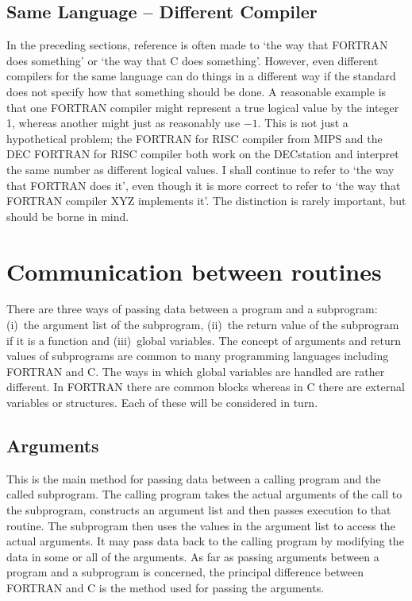 \subsection{Same Language -- Different Compiler}

In the preceding sections, reference is often made to `the way that FORTRAN
does something' or `the way that C does something'. However, even different
compilers for the same language can do things in a different way if the
standard does not specify how that something should be done. A reasonable
example is that one FORTRAN compiler might represent a true logical value by
the integer 1, whereas another might just as reasonably use $-1$. This is not
just a hypothetical problem; the FORTRAN for RISC compiler from MIPS and the
DEC FORTRAN for RISC compiler both work on the DECstation and interpret the
same number as different logical values. I shall continue to refer to `the way
that FORTRAN does it', even though it is more correct to refer to `the way that
FORTRAN compiler XYZ implements it'. The distinction is rarely important, but
should be borne in mind.

\section{Communication between routines}

There are three ways of passing data between a program and a subprogram:
(i)~the argument list of the subprogram, (ii)~the return value of the
subprogram if it is a function and (iii)~global variables. The concept of
arguments and return values of subprograms are common to many programming
languages including FORTRAN and C. The ways in which global variables are
handled are rather different. In FORTRAN there are common blocks whereas in C
there are external variables or structures. Each of these will be considered in
turn.

\subsection{Arguments}
\label{arg}

This is the main method for passing data between a calling program and the
called subprogram. The calling program takes the actual arguments of the call
to the  subprogram, constructs an argument list and then passes execution to
that routine. The subprogram then uses the values in the argument list to
access the actual arguments. It may pass data back to the calling program by
modifying the data in some or all of the arguments. As far as passing arguments
between a program and a subprogram is concerned, the principal difference
between FORTRAN and C is the method used for passing the arguments.

